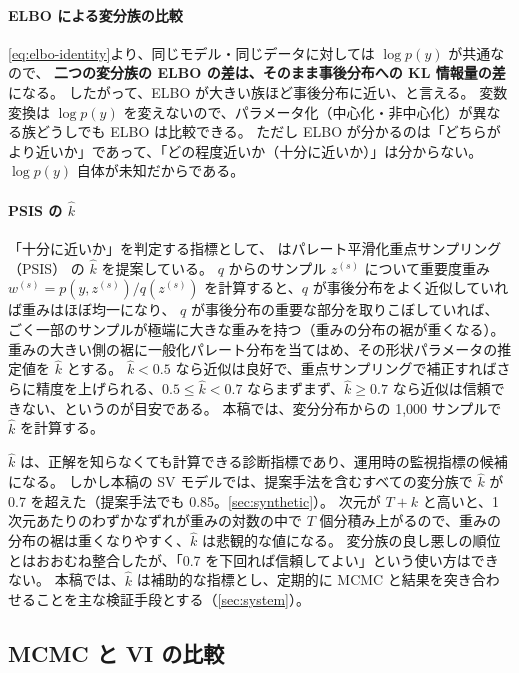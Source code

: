 \paragraph{ELBO による変分族の比較}
\cref{eq:elbo-identity}より、同じモデル・同じデータに対しては $\log p(y)$ が共通なので、
\textbf{二つの変分族の ELBO の差は、そのまま事後分布への KL 情報量の差}になる。
したがって、ELBO が大きい族ほど事後分布に近い、と言える。
変数変換は $\log p(y)$ を変えないので、パラメータ化（中心化・非中心化）が異なる族どうしでも ELBO は比較できる。
ただし ELBO が分かるのは「どちらがより近いか」であって、「どの程度近いか（十分に近いか）」は分からない。
$\log p(y)$ 自体が未知だからである。

\paragraph{PSIS の $\hat k$}
「十分に近いか」を判定する指標として、\textcite{yao2018} はパレート平滑化重点サンプリング（PSIS）\parencite{vehtari2024} の $\hat k$ を提案している。
$q$ からのサンプル $z^{(s)}$ について重要度重み $w^{(s)} = p(y, z^{(s)}) / q(z^{(s)})$ を計算すると、$q$ が事後分布をよく近似していれば重みはほぼ均一になり、
$q$ が事後分布の重要な部分を取りこぼしていれば、ごく一部のサンプルが極端に大きな重みを持つ（重みの分布の裾が重くなる）。
重みの大きい側の裾に一般化パレート分布を当てはめ、その形状パラメータの推定値を $\hat k$ とする。
$\hat k < 0.5$ なら近似は良好で、重点サンプリングで補正すればさらに精度を上げられる、$0.5 \leq \hat k < 0.7$ ならまずまず、$\hat k \geq 0.7$ なら近似は信頼できない、というのが目安である。
本稿では、変分分布からの 1,000 サンプルで $\hat k$ を計算する。

$\hat k$ は、正解を知らなくても計算できる診断指標であり、運用時の監視指標の候補になる。
しかし本稿の SV モデルでは、提案手法を含むすべての変分族で $\hat k$ が 0.7 を超えた（提案手法でも 0.85。\cref{sec:synthetic}）。
次元が $T + k$ と高いと、1 次元あたりのわずかなずれが重みの対数の中で $T$ 個分積み上がるので、重みの分布の裾は重くなりやすく、$\hat k$ は悲観的な値になる。
変分族の良し悪しの順位とはおおむね整合したが、「0.7 を下回れば信頼してよい」という使い方はできない。
本稿では、$\hat k$ は補助的な指標とし、定期的に MCMC と結果を突き合わせることを主な検証手段とする（\cref{sec:system}）。

\subsection{MCMC と VI の比較}\label{sec:inf-compare}

